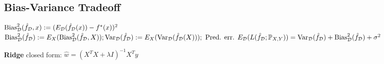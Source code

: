 \subsection*{Bias-Variance Tradeoff}
\(\text{Bias}_{\mathcal{D}}^2(\hat{f}_{\mathcal{D}}, x) := (E_{\mathcal{D}}(\hat{f}_{\mathcal{D}}(x))-f^*(x))^2\)\\
\(\text{Bias}^2_{\mathcal{D}}(\hat{f}_{\mathcal{D}}) := E_X(\text{Bias}_{\mathcal{D}}^2(\hat{f}_{\mathcal{D}}, X));
\text{Var}_{\mathcal{D}}(\hat{f}_{\mathcal{D}}) := E_X(\text{Var}_{\mathcal{D}}(\hat{f}_{\mathcal{D}}(X)));\text{ Pred. err. } 
E_{\mathcal{D}}(L(\hat{f}_{\mathcal{D}}; \mathbb{P}_{X,Y})) = \text{Var}_{\mathcal{D}}(\hat{f}_{\mathcal{D}})+\text{Bias}_{\mathcal{D}}^2(\hat{f}_{\mathcal{D}})+\sigma^2\)

\textbf{Ridge} closed form: $\hat{w}=(X^T X + \lambda I)^{-1} X^T y$








